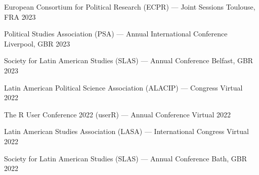 \begin{cvhonors}
\cvconf
{European Consortium for Political Research (ECPR) --- Joint Sessions} 
{Toulouse, FRA}
{2023}
\end{cvhonors}

\begin{cvhonors}
\cvconf
{Political Studies Association (PSA) --- Annual International Conference} 
{Liverpool, GBR}
{2023}
\end{cvhonors}

\begin{cvhonors}
\cvconf
{Society for Latin American Studies (SLAS) --- Annual Conference} 
{Belfast, GBR}
{2023}
\end{cvhonors}




\begin{cvhonors}
\cvconf
{Latin American Political Science Association (ALACIP) --- Congress} 
{Virtual}
{2022}
\end{cvhonors}


\begin{cvhonors}
\cvconf
{The R User Conference 2022 (userR) --- Annual Conference} 
{Virtual}
{2022}
\end{cvhonors}

\begin{cvhonors}
\cvconf
{Latin American Studies Association (LASA) --- International Congress} 
{Virtual}
{2022}
\end{cvhonors}

\begin{cvhonors}
\cvconf
{Society for Latin American Studies (SLAS) --- Annual Conference} 
{Bath, GBR}
{2022}
\end{cvhonors}


